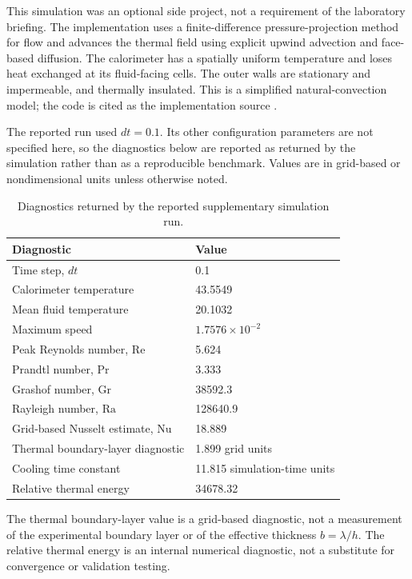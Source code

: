 \documentclass[12pt,a4paper]{article}
\begin{document}
This simulation was an optional side project, not a requirement
of the laboratory briefing. The implementation uses a
finite-difference pressure-projection method for flow and advances
the thermal field using explicit upwind advection and face-based
diffusion. The calorimeter has a spatially uniform temperature
and loses heat exchanged at its fluid-facing cells. The outer
walls are stationary and impermeable, and thermally insulated.
This is a simplified natural-convection model; the code is cited
as the implementation source \cite{cullinane2026simulation}.

The reported run used $dt=0.1$. Its other configuration
parameters are not specified here, so the diagnostics below are
reported as returned by the simulation rather than as a
reproducible benchmark. Values are in grid-based or
nondimensional units unless otherwise noted.

\begin{table}[H]
    \centering
    \caption{Diagnostics returned by the reported supplementary
    simulation run.}
    \label{tab:simulation-diagnostics}
    \begin{tabular}{ll}
    \toprule
    Diagnostic & Value\\
    \midrule
    Time step, $dt$ & 0.1\\
    Calorimeter temperature & 43.5549\\
    Mean fluid temperature & 20.1032\\
    Maximum speed & $1.7576\times10^{-2}$\\
    Peak Reynolds number, $\mathrm{Re}$ & 5.624\\
    Prandtl number, $\mathrm{Pr}$ & 3.333\\
    Grashof number, $\mathrm{Gr}$ & 38592.3\\
    Rayleigh number, $\mathrm{Ra}$ & 128640.9\\
    Grid-based Nusselt estimate, $\mathrm{Nu}$ & 18.889\\
    Thermal boundary-layer diagnostic & 1.899 grid units\\
    Cooling time constant & 11.815 simulation-time units\\
    Relative thermal energy & 34678.32\\
    \bottomrule
    \end{tabular}
\end{table}

The thermal boundary-layer value is a grid-based diagnostic, not
a measurement of the experimental boundary layer or of the
effective thickness $b=\lambda/h$. The relative thermal energy
is an internal numerical diagnostic, not a substitute for
convergence or validation testing.
\end{document}
